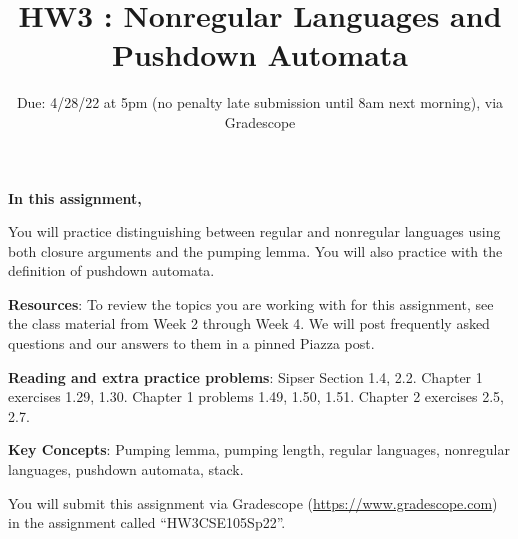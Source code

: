 

\title{HW3 : Nonregular Languages and Pushdown Automata}
\date{Due: 4/28/22 at 5pm (no penalty late submission until 8am next morning), via Gradescope}


\maketitle
\thispagestyle{fancy}

{\bf In this assignment,}

You will practice distinguishing between regular and nonregular languages using both closure
arguments and the pumping lemma. You will also practice with the definition of pushdown automata.

{\bf Resources}: To review the topics you are working with 
for this assignment, see the class material from  Week 2 through Week 4.
We will post frequently asked questions and our answers to them in a 
pinned Piazza post.

{\bf Reading and extra practice problems}: Sipser Section 1.4, 2.2.
Chapter 1 exercises 1.29, 1.30. Chapter 1 problems 1.49, 1.50, 1.51. Chapter 2 exercises 2.5, 2.7.

{\bf Key Concepts}: Pumping lemma, pumping length, regular languages, 
nonregular languages, pushdown automata, stack.

\instructions

You will submit this assignment via Gradescope
(\href{https://www.gradescope.com}{https://www.gradescope.com}) 
in the assignment called ``HW3CSE105Sp22''.

